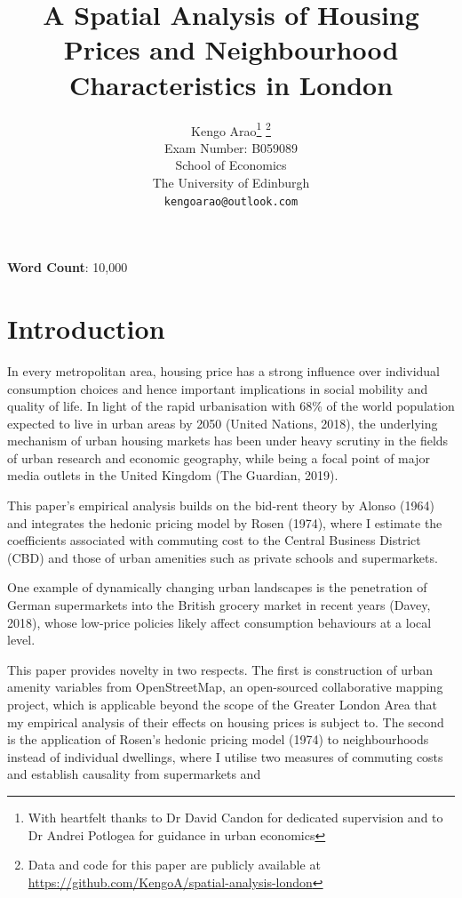 \documentclass{article}
\title{A Spatial Analysis of Housing Prices and Neighbourhood Characteristics in London}
\author{
  \large{Kengo Arao}\thanks{With heartfelt thanks to Dr David Candon for dedicated supervision and to Dr Andrei Potlogea for guidance in urban economics}      \thanks{Data and code for this paper are publicly available at \href{https://github.com/KengoA/spatial-analysis-london}{https://github.com/KengoA/spatial-analysis-london}} \\
  Exam Number: B059089 \\
  School of Economics\\
  The University of Edinburgh\\
  \texttt{kengoarao@outlook.com}
}
\begin{document}
\maketitle

\begin{abstract}
\lipsum[1]
\end{abstract}

\begin{center}
    \textbf{Word Count}: 10,000
\end{center}

\newpage
\tableofcontents

\newpage
\section{Introduction}
 In every metropolitan area, housing price has a strong influence over individual consumption choices and hence important implications in social mobility and quality of life. In light of the rapid urbanisation with 68\% of the world population expected to live in urban areas by 2050 (United Nations, 2018), the underlying mechanism of urban housing markets has been under heavy scrutiny in the fields of urban research and economic geography, while being a focal point of major media outlets in the United Kingdom (The Guardian, 2019).
 
 This paper's empirical analysis builds on the bid-rent theory by Alonso (1964) and integrates the hedonic pricing model by Rosen (1974), where I estimate the coefficients associated with commuting cost to the Central Business District (CBD) and those of urban amenities such as private schools and supermarkets. 
 
 
  One example of dynamically changing urban landscapes is the penetration of German supermarkets into the British grocery market in recent years (Davey, 2018), whose low-price policies likely affect consumption behaviours at a local level. 


This paper provides novelty in two respects. The first is construction of urban amenity variables from OpenStreetMap, an open-sourced collaborative mapping project, which is applicable beyond the scope of the Greater London Area that my empirical analysis of their effects on housing prices is subject to. The second is the application of Rosen's hedonic pricing model (1974) to neighbourhoods instead of individual dwellings, where I utilise two measures of commuting costs and 
establish causality from supermarkets and 
\end{document}
